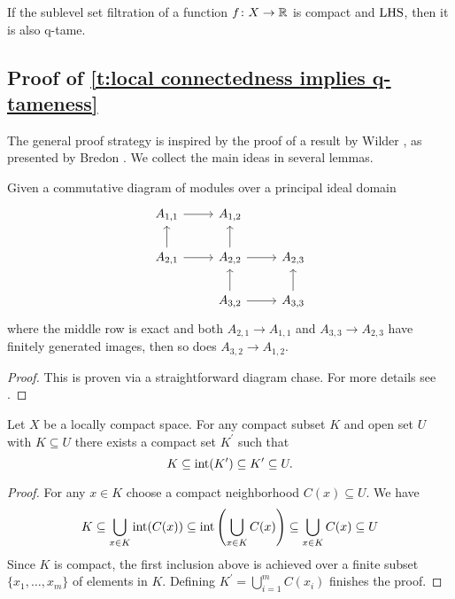 \begin{thm} \label{t:local connectedness implies q-tameness}
	If the sublevel set filtration of a function $f \colon X \to \mathbb{R}$ is compact and	$\mathrm{LHS}$, then it is also q-tame.
\end{thm}


\subsection{Proof of \cref{t:local connectedness implies q-tameness}}

The general proof strategy is inspired by the proof of a result by Wilder \cite[p.~325]{Wilder.1949}, as presented by Bredon \cite[Section II.17]{Bredon.1997}.
We collect the main ideas in several lemmas.

\begin{lem} \label{l:commutative algebra}
	Given a commutative diagram of modules over a principal ideal domain
	\begin{equation*}
	\begin{tikzcd}
	A_{1,1} \arrow[r] & A_{1,2} & \\
	A_{2,1} \arrow[r] \arrow[u] & A_{2,2} \arrow[r] \arrow[u] & A_{2,3} \\
	& A_{3,2} \arrow[r] \arrow[u] & A_{3,3} \arrow[u]
	\end{tikzcd}
	\end{equation*}
	where the middle row is exact and both $A_{2,1} \to A_{1,1}$ and $A_{3,3} \to A_{2,3}$ have finitely generated images, then so does $A_{3,2} \to A_{1,2}$.
\end{lem}

\begin{proof}
	This is proven via a straightforward diagram chase.
	For more details see \cite[Lemma II.17.3]{Bredon.1997}.
\end{proof}

\begin{lem} \label{l:neighborhood third}
	Let $X$ be a locally compact space.
	For any compact subset $K$ and open set $U$ with $K \subseteq U$ there exists a compact set $K^\prime$ such that
	\begin{equation*}
	K \subseteq \operatorname{int}(K^\prime) \subseteq K^\prime \subseteq U.
	\end{equation*}
\end{lem}

\begin{proof}
	For any $x \in K$ choose a compact neighborhood $C(x) \subseteq U$.
	We have
	\begin{equation*}
	K \subseteq \bigcup_{x \in K} \operatorname{int}(C(x)) \subseteq \operatorname{int}\left(\bigcup_{x \in K} C(x)\right) \subseteq \bigcup_{x \in K} C(x) \subseteq U
	\end{equation*}
	Since $K$ is compact, the first inclusion above is achieved over a finite subset $\{x_1, \dots, x_m\}$ of elements in $K$.
	Defining $K^\prime = \bigcup_{i=1}^m C(x_i)$ finishes the proof.
\end{proof}

